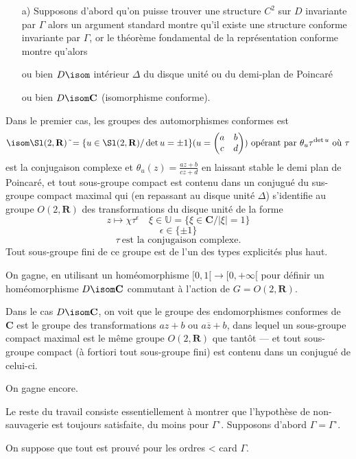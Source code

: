 \begin{enumerate}
    \item[a)] Supposons d'abord qu'on puisse trouver une structure $C^2$ sur $D$ invariante par $\Gamma$ alors un argument standard montre qu'il existe une structure conforme invariante par $\Gamma$, or le théorème fondamental de la représentation conforme montre qu'alors
    
    ou bien $D \isom$ intérieur $\Delta$ du disque unité ou du demi-plan de Poincaré
    
    ou bien $D \isom \mathbf{C}$ (isomorphisme conforme).
\end{enumerate}
Dans le premier cas, les groupes des automorphismes conformes est
$$
\isom \Sl (2, \mathbf{R}) ~\tilde{} = \{ u \in \Sl (2, \mathbf{R}) / \det u = \pm 1 \}  (u = \begin{pmatrix}
a & b \\
c & d 
\end{pmatrix})~\text{opérant par}~\theta_u \tau^{\det u}~\text{où}~\tau
$$
est la conjugaison complexe et $\theta_u (z) = \frac{az + b}{cz + d}$ en laissant stable le demi plan de Poincaré, et tout sous-groupe compact est contenu dans un conjugué du sus-groupe compact maximal qui (en repassant au disque unité $\Delta$) s'identifie au groupe $O (2, \mathbf{R})$ des transformations du disque unité de la forme
$$
z \mapsto \chi \tau^\epsilon \quad \xi \in \mathbb{U} = \{ \xi \in \mathbf{C} / |\xi| = 1 \}
$$
$$
\epsilon \in \{ \pm 1 \}
$$
$$
\tau~\text{est la conjugaison complexe}.
$$
Tout sous-groupe fini de ce groupe est de l'un des types explicités plus haut.

On gagne, en utilisant un homéomorphisme $[ 0, 1 [ \to [0, +\infty [$ pour définir un homéomorphisme $D \isom \mathbf{C}$ commutant à l'action de $G = O (2, \mathbf{R})$.

Dans le cas $D \isom \mathbf{C}$, on voit que le groupe des endomorphismes conformes de $\mathbf{C}$ est le groupe des transformations $az + b$ ou $a \overline{z} + b$, dans lequel un sous-groupe compact maximal est le même groupe $O (2, \mathbf{R})$ que tantôt --- et tout sous-groupe compact (à fortiori tout sous-groupe fini) est contenu dans un conjugué de celui-ci.

On gagne encore.

Le reste du travail consiste essentiellement à montrer que l'hypothèse de non-sauvagerie est toujours satisfaite, du moins pour $\Gamma^\circ$. Supposons d'abord $\Gamma = \Gamma^\circ$.

On suppose que tout est prouvé pour les ordres < card $\Gamma$.

